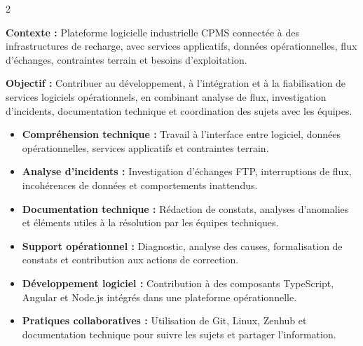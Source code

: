 \documentclass[8pt,a4paper,ragged2e,withhyper]{altacv}
\begin{document}



\makecvheader
\vspace{-0.3cm}


\begin{paracol}{2}



\textbf{Contexte :} Plateforme logicielle industrielle CPMS connectée à des infrastructures de recharge, avec services applicatifs, données opérationnelles, flux d’échanges, contraintes terrain et besoins d’exploitation.

\textbf{Objectif :} Contribuer au développement, à l’intégration et à la fiabilisation de services logiciels opérationnels, en combinant analyse de flux, investigation d’incidents, documentation technique et coordination des sujets avec les équipes.

\begin{itemize}
  \item \textbf{Compréhension technique :} Travail à l’interface entre logiciel, données opérationnelles, services applicatifs et contraintes terrain.
  \item \textbf{Analyse d’incidents :} Investigation d’échanges FTP, interruptions de flux, incohérences de données et comportements inattendus.
  \item \textbf{Documentation technique :} Rédaction de constats, analyses d’anomalies et éléments utiles à la résolution par les équipes techniques.
  \item \textbf{Support opérationnel :} Diagnostic, analyse des causes, formalisation de constats et contribution aux actions de correction.
  \item \textbf{Développement logiciel :} Contribution à des composants TypeScript, Angular et Node.js intégrés dans une plateforme opérationnelle.
  \item \textbf{Pratiques collaboratives :} Utilisation de Git, Linux, Zenhub et documentation technique pour suivre les sujets et partager l’information.
\end{itemize}


\end{paracol}
\end{document}
